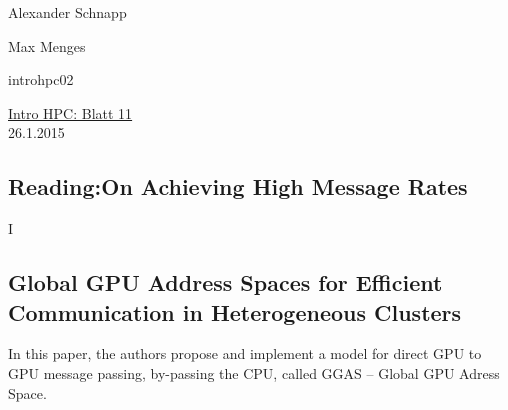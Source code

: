 \documentclass[a4paper,11pt]{scrartcl}
\begin{document}
\hfill Alexander Schnapp

\hfill Max Menges

\hfill introhpc02

\begin{center}
\underline{\Huge{Intro HPC: Blatt 11}}\\
\large{26.1.2015}\\
\end{center}



\subsection{Reading:On Achieving High Message Rates}
I
\subsection{Global GPU Address Spaces for Efficient
Communication in Heterogeneous Clusters}
In this paper, the authors propose and implement a model for direct GPU to GPU message passing, by-passing the CPU, called GGAS -- Global GPU Adress Space. 
\end{document}
